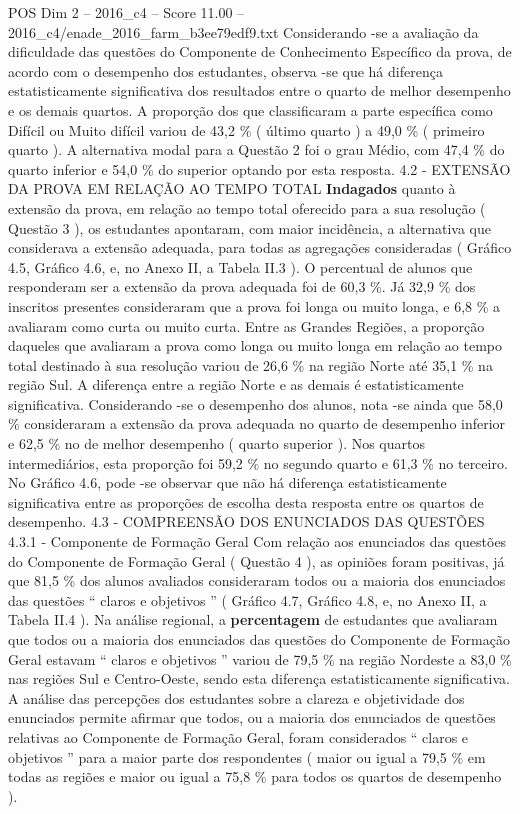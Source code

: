 \begin{textsample}{POS Dim 2 – 2016\_c4 – Score 11.00 – 2016\_c4/enade\_2016\_farm\_b3ee79edf9.txt}
Considerando -se a avaliação da dificuldade das questões do Componente de Conhecimento Específico da prova, de acordo com o desempenho dos estudantes, observa -se que há diferença estatisticamente significativa dos resultados entre o quarto de melhor desempenho e os demais quartos.
A proporção dos que classificaram a parte específica como Difícil ou Muito difícil variou de 43,2 \% ( último quarto ) a 49,0 \% ( primeiro quarto ).
A alternativa modal para a Questão 2 foi o grau Médio, com 47,4 \% do quarto inferior e 54,0 \% do superior optando por esta resposta. 4.2 - EXTENSÃO DA PROVA EM RELAÇÃO AO TEMPO TOTAL \textbf{Indagados} quanto à extensão da prova, em relação ao tempo total oferecido para a sua resolução ( Questão 3 ), os estudantes apontaram, com maior incidência, a alternativa que considerava a extensão adequada, para todas as agregações consideradas ( Gráfico 4.5, Gráfico 4.6, e, no Anexo II, a Tabela II.3 ).
O percentual de alunos que responderam ser a extensão da prova adequada foi de 60,3 \%.
Já 32,9 \% dos inscritos presentes consideraram que a prova foi longa ou muito longa, e 6,8 \% a avaliaram como curta ou muito curta.
Entre as Grandes Regiões, a proporção daqueles que avaliaram a prova como longa ou muito longa em relação ao tempo total destinado à sua resolução variou de 26,6 \% na região Norte até 35,1 \% na região Sul.
A diferença entre a região Norte e as demais é estatisticamente significativa.
Considerando -se o desempenho dos alunos, nota -se ainda que 58,0 \% consideraram a extensão da prova adequada no quarto de desempenho inferior e 62,5 \% no de melhor desempenho ( quarto superior ).
Nos quartos intermediários, esta proporção foi 59,2 \% no segundo quarto e 61,3 \% no terceiro.
No Gráfico 4.6, pode -se observar que não há diferença estatisticamente significativa entre as proporções de escolha desta resposta entre os quartos de desempenho. 4.3 - COMPREENSÃO DOS ENUNCIADOS DAS QUESTÕES 4.3.1 - Componente de Formação Geral Com relação aos enunciados das questões do Componente de Formação Geral ( Questão 4 ), as opiniões foram positivas, já que 81,5 \% dos alunos avaliados consideraram todos ou a maioria dos enunciados das questões “ claros e objetivos ” ( Gráfico 4.7, Gráfico 4.8, e, no Anexo II, a Tabela II.4 ).
Na análise regional, a \textbf{percentagem} de estudantes que avaliaram que todos ou a maioria dos enunciados das questões do Componente de Formação Geral estavam “ claros e objetivos ” variou de 79,5 \% na região Nordeste a 83,0 \% nas regiões Sul e Centro-Oeste, sendo esta diferença estatisticamente significativa.
A análise das percepções dos estudantes sobre a clareza e objetividade dos enunciados permite afirmar que todos, ou a maioria dos enunciados de questões relativas ao Componente de Formação Geral, foram considerados “ claros e objetivos ” para a maior parte dos respondentes ( maior ou igual a 79,5 \% em todas as regiões e maior ou igual a 75,8 \% para todos os quartos de desempenho ).

\end{textsample}
